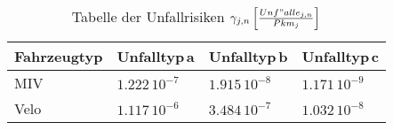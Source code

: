 %
%
%
%

\begin{table}[h!]
\center
%
%
\begin{tabular}{@{}p{2.6cm} p{3.3cm} p{3.3cm} p{3.3cm}@{}} \\   
\toprule
\textbf{Fahrzeugtyp} & \textbf{Unfalltyp\,a} & \textbf{Unfalltyp\,b} & \textbf{Unfalltyp\,c} \\
\midrule
MIV      & \(1.222\,\mathrm{10^{-7}}\)  & \(1.915\,\mathrm{10^{-8}}\)  & \(1.171\,\mathrm{10^{-9}}\)  \\
Velo	 & \(1.117\,\mathrm{10^{-6}}\)  & \(3.484\,\mathrm{10^{-7}}\)  & \(1.032\,\mathrm{10^{-8}}\)   \\

\bottomrule

\end{tabular}
\caption[Tabelle der Unfallrisiken]{Tabelle der Unfallrisiken $\gamma_{j,n}\,\Bigl[\frac{Unf"alle_{j,n}}{Pkm_{j}}\Bigl]$}
\label{tab:t-06-01-Unfallrisiko}
\end{table}


%


